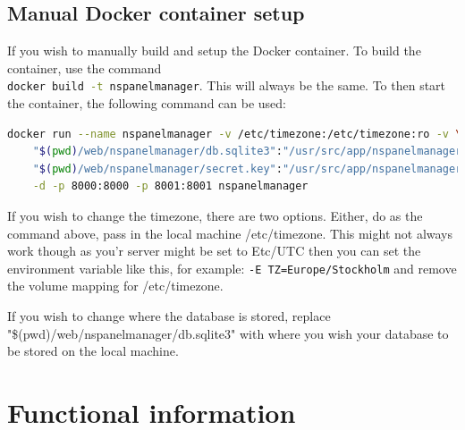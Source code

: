 \documentclass[10pt]{article}
\begin{document}
    \subsection{Manual Docker container setup}
    If you wish to manually build and setup the Docker container. To build the container, use the command \\ \lstinline[language=bash]{docker build -t nspanelmanager}. This will always be the same. To then start the container, the following command can be used:
    \begin{lstlisting}[language=bash]
    docker run --name nspanelmanager -v /etc/timezone:/etc/timezone:ro -v \
    "$(pwd)/web/nspanelmanager/db.sqlite3":"/usr/src/app/nspanelmanager/db.sqlite3" \
    "$(pwd)/web/nspanelmanager/secret.key":"/usr/src/app/nspanelmanager/secret.key" \
    -d -p 8000:8000 -p 8001:8001 nspanelmanager
    \end{lstlisting}
    If you wish to change the timezone, there are two options. Either, do as the command above, pass in the local machine /etc/timezone. This might not always work though as you'r server might be set to Etc/UTC then you can set the environment variable like this, for example: \lstinline[language=bash]{-E TZ=Europe/Stockholm} and remove the volume mapping for /etc/timezone.

    If you wish to change where the database is stored, replace "\$(pwd)/web/nspanelmanager/db.sqlite3" with where you wish your database to be stored on the local machine.


    \clearpage
    \section{Functional information}
\end{document}
